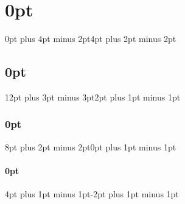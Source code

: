 



\ifshowdraftnotes
\setcounter{tocdepth}{2}    %
\else
\setcounter{tocdepth}{1}    %
\fi
\setcounter{secnumdepth}{2} %

\makeatletter %
\makeatother  

\titlespacing\chapter{0pt}{0pt plus 4pt minus 2pt}{4pt plus 2pt minus 2pt}
\titlespacing\section{0pt}{12pt plus 3pt minus 3pt}{2pt plus 1pt minus 1pt}
\titlespacing\subsection{0pt}{8pt plus 2pt minus 2pt}{0pt plus 1pt minus 1pt}
\titlespacing\subsubsection{0pt}{4pt plus 1pt minus 1pt}{-2pt plus 1pt minus 1pt}
\captionsetup{belowskip=\parskip,aboveskip=4pt plus 1pt minus 1pt}



